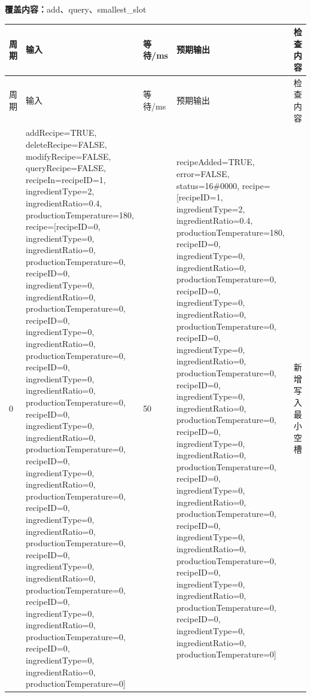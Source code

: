 \textbf{覆盖内容：}add、query、smallest\_slot

\begin{longtable}{L{1.0cm}L{4.7cm}L{1.4cm}L{4.0cm}L{2.1cm}}

\toprule

周期 & 输入 & 等待/ms & 预期输出 & 检查内容\\

\midrule

\endfirsthead

\toprule

周期 & 输入 & 等待/ms & 预期输出 & 检查内容\\

\midrule

\endhead

0 & addRecipe=TRUE, deleteRecipe=FALSE, modifyRecipe=FALSE, queryRecipe=FALSE, recipeIn=recipeID=1, ingredientType=2, ingredientRatio=0.4, productionTemperature=180, recipe=[recipeID=0, ingredientType=0, ingredientRatio=0, productionTemperature=0, recipeID=0, ingredientType=0, ingredientRatio=0, productionTemperature=0, recipeID=0, ingredientType=0, ingredientRatio=0, productionTemperature=0, recipeID=0, ingredientType=0, ingredientRatio=0, productionTemperature=0, recipeID=0, ingredientType=0, ingredientRatio=0, productionTemperature=0, recipeID=0, ingredientType=0, ingredientRatio=0, productionTemperature=0, recipeID=0, ingredientType=0, ingredientRatio=0, productionTemperature=0, recipeID=0, ingredientType=0, ingredientRatio=0, productionTemperature=0, recipeID=0, ingredientType=0, ingredientRatio=0, productionTemperature=0, recipeID=0, ingredientType=0, ingredientRatio=0, productionTemperature=0] & 50 & recipeAdded=TRUE, error=FALSE, status=16\#0000, recipe=[recipeID=1, ingredientType=2, ingredientRatio=0.4, productionTemperature=180, recipeID=0, ingredientType=0, ingredientRatio=0, productionTemperature=0, recipeID=0, ingredientType=0, ingredientRatio=0, productionTemperature=0, recipeID=0, ingredientType=0, ingredientRatio=0, productionTemperature=0, recipeID=0, ingredientType=0, ingredientRatio=0, productionTemperature=0, recipeID=0, ingredientType=0, ingredientRatio=0, productionTemperature=0, recipeID=0, ingredientType=0, ingredientRatio=0, productionTemperature=0, recipeID=0, ingredientType=0, ingredientRatio=0, productionTemperature=0, recipeID=0, ingredientType=0, ingredientRatio=0, productionTemperature=0, recipeID=0, ingredientType=0, ingredientRatio=0, productionTemperature=0] & 新增写入最小空槽\\


\end{longtable}
